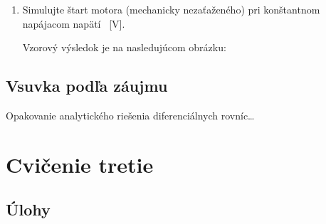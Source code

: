 \documentclass[a4paper, 10pt, ]{article}
\begin{document}
\begin{enumerate}[leftmargin=0pt, labelsep=4mm, itemsep=0pt]
	\item Simulujte štart motora (mechanicky nezaťaženého) pri konštantnom napájacom napätí ~[V].

	Vzorový výsledok je na nasledujúcom obrázku:

	\begin{center}


		\label{Grafické znázornenie výsledku numerickej simulácie}

	\end{center}





\end{enumerate}




\subsection{Vsuvka podľa záujmu}

Opakovanie analytického riešenia diferenciálnych rovníc\ldots





























\section{Cvičenie tretie}


\subsection{Úlohy}
\end{document}

